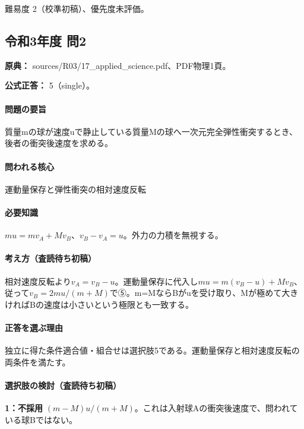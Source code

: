\par 難易度 2（校準初稿）、優先度未評価。

\subsection{令和3年度 問2}
\label{q:r03-reg-applied-02}

\noindent\textbf{原典：} sources/R03/17\_applied\_science.pdf、PDF物理1頁。

\textbf{公式正答：} 5（single）。

\paragraph{問題の要旨} 質量mの球が速度uで静止している質量Mの球へ一次元完全弾性衝突するとき、後者の衝突後速度を求める。

\paragraph{問われる核心} 運動量保存と弾性衝突の相対速度反転

\paragraph{必要知識} \(mu=mv_A+Mv_B\)、\(v_B-v_A=u\)。外力の力積を無視する。

\paragraph{考え方（査読待ち初稿）} 相対速度反転より\(v_A=v_B-u\)。運動量保存に代入し\(mu=m(v_B-u)+Mv_B\)、従って\(v_B=2mu/(m+M)\)で⑤。m=\allowbreak{}MならBがuを受け取り、Mが極めて大きければBの速度は小さいという極限とも一致する。

\paragraph{正答を選ぶ理由} 独立に得た条件適合値・組合せは選択肢5である。運動量保存と相対速度反転の両条件を満たす。

\paragraph{選択肢の検討（査読待ち初稿）}\mbox{}\par

\noindent\textbf{1：不採用} \((m-M)u/(m+M)\)。これは入射球Aの衝突後速度で、問われている球Bではない。\par

